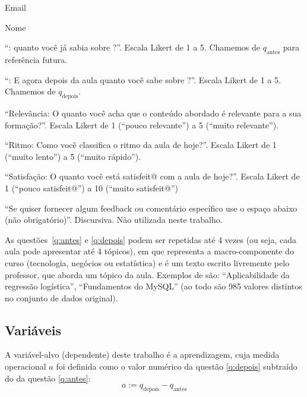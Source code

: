 \begin{compactenum}
	\item Email
	
	\item Nome
	
	\item\label{q:antes} ``: quanto você já sabia sobre ?''.
	Escala Likert de 1 a 5.
	Chamemos de $q_\text{antes}$ para referência futura.
	
	\item\label{q:depois} ``: E agora depois da aula quanto você sabe sobre ?''.
	Escala Likert de 1 a 5.
	Chamemos de $q_\text{depois}$.
	
	\item\label{q:relevancia} ``Relevância: O quanto você acha que o conteúdo abordado é relevante para a sua formação?''. Escala Likert de 1 (``pouco relevante'') a 5 (``muito relevante'').
	
	\item\label{q:ritmo} ``Ritmo: Como você classifica o ritmo da aula de hoje?''. Escala Likert de 1 (``muito lento'') a 5 (``muito rápido'').
	
	\item\label{q:satisfação} ``Satisfação: O quanto você está satisfeit@ com a aula de hoje?''.
	Escala Likert de 1 (``pouco satisfeit@'') a 10 (``muito satisfeit@'')
	
	\item ``Se quiser fornecer algum feedback ou comentário específico use o espaço abaixo (não obrigatório)''.
	Discursiva.
	Não utilizada neste trabalho.
\end{compactenum}

As questões~\ref{q:antes} e \ref{q:depois} podem ser repetidas até 4 vezes (ou seja, cada aula pode apresentar até 4 tópicos), em que  representa a macro-componente do curso (tecnologia, negócios ou estatística) e  é um texto escrito livremente pelo professor, que aborda um tópico da aula.
Exemplos de  são: ``Aplicabilidade da regressão logística'', ``Fundamentos do MySQL'' \etc (ao todo são 985 valores distintos no conjunto de dados original).

\subsection{Variáveis}

A variável-alvo (dependente) deste trabalho é a aprendizagem, cuja medida operacional $a$ foi definida como o valor numérico da questão \ref{q:depois} subtraído do da questão \ref{q:antes}:
\begin{equation}\label{eq:a}
	a := q_\text{depois} - q_\text{antes}
\end{equation}


